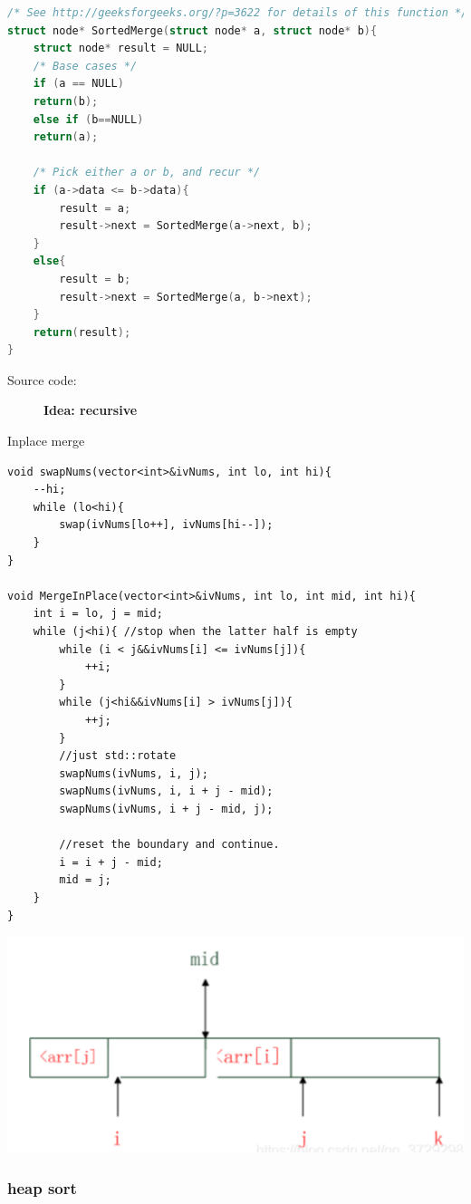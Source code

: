 \documentclass[a4paper,11pt,twoside]{book}
\begin{document}
\begin{lstlisting}[frame=single, language=c++] 
/* See http://geeksforgeeks.org/?p=3622 for details of this function */
struct node* SortedMerge(struct node* a, struct node* b){
	struct node* result = NULL;	
	/* Base cases */
	if (a == NULL)
	return(b);
	else if (b==NULL)
	return(a);
	
	/* Pick either a or b, and recur */
	if (a->data <= b->data){
		result = a;
		result->next = SortedMerge(a->next, b);
	}
	else{
		result = b;
		result->next = SortedMerge(a, b->next);
	}
	return(result);
}	
\end{lstlisting}
\begin{description}
	\item[Source code:] \textbf{Idea: recursive}
\end{description}

	\par Inplace merge
\begin{lstlisting}
void swapNums(vector<int>&ivNums, int lo, int hi){
	--hi;
	while (lo<hi){
		swap(ivNums[lo++], ivNums[hi--]);
	}
}

void MergeInPlace(vector<int>&ivNums, int lo, int mid, int hi){
	int i = lo, j = mid;
	while (j<hi){ //stop when the latter half is empty
		while (i < j&&ivNums[i] <= ivNums[j]){
			++i;
		}
		while (j<hi&&ivNums[i] > ivNums[j]){
			++j;
		}
		//just std::rotate
		swapNums(ivNums, i, j);
		swapNums(ivNums, i, i + j - mid);
		swapNums(ivNums, i + j - mid, j);
		
		//reset the boundary and continue.
		i = i + j - mid;
		mid = j;
	}
}
\end{lstlisting}

\begin{center}
	\includegraphics[scale=0.45]{pics/inplace}
\end{center}

\subsubsection{heap sort}
\end{document}
